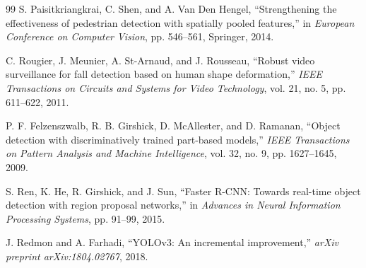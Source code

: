 \documentclass[conference]{IEEEtran}
\begin{document}
\begin{thebibliography}{99}
S. Paisitkriangkrai, C. Shen, and A. Van Den Hengel, ``Strengthening the effectiveness of pedestrian detection with spatially pooled features,'' in \textit{European Conference on Computer Vision}, pp. 546--561, Springer, 2014.

C. Rougier, J. Meunier, A. St-Arnaud, and J. Rousseau, ``Robust video surveillance for fall detection based on human shape deformation,'' \textit{IEEE Transactions on Circuits and Systems for Video Technology}, vol. 21, no. 5, pp. 611--622, 2011.

P. F. Felzenszwalb, R. B. Girshick, D. McAllester, and D. Ramanan, ``Object detection with discriminatively trained part-based models,'' \textit{IEEE Transactions on Pattern Analysis and Machine Intelligence}, vol. 32, no. 9, pp. 1627--1645, 2009.

S. Ren, K. He, R. Girshick, and J. Sun, ``Faster R-CNN: Towards real-time object detection with region proposal networks,'' in \textit{Advances in Neural Information Processing Systems}, pp. 91--99, 2015.

J. Redmon and A. Farhadi, ``YOLOv3: An incremental improvement,'' \textit{arXiv preprint arXiv:1804.02767}, 2018.

\end{thebibliography}
\end{document}
